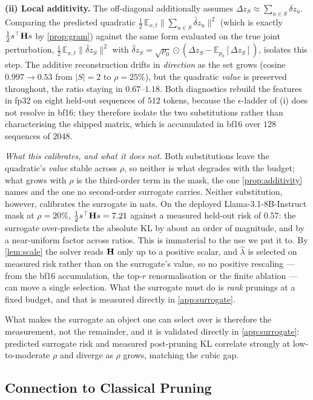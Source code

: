 \textbf{(ii) Local additivity.} The off-diagonal additionally assumes
$\Delta z_S\approx\sum_{u\in S}\delta z_u$. Comparing the predicted quadratic
$\tfrac12\,\mathbb{E}_{x,t}\|\sum_{u\in S}\widetilde{\delta z}_u\|^2$ (which is exactly
$\tfrac12 s^\top\mathbf{H} s$ by \cref{prop:gram}) against the same form evaluated on the true joint
perturbation, $\tfrac12\,\mathbb{E}_{x,t}\|\widetilde{\delta z}_S\|^2$ with
$\widetilde{\delta z}_S=\sqrt{p_0}\odot(\Delta z_S-\mathbb{E}_{p_0}[\Delta z_S])$, isolates this
step. The additive reconstruction drifts in
\emph{direction} as the set grows (cosine $0.997\!\to\!0.53$ from $|S|=2$ to $\rho=25\%$), but the
quadratic \emph{value} is preserved throughout, the ratio staying in $0.67$--$1.18$. Both diagnostics
rebuild the features in fp32 on eight held-out sequences of
$512$ tokens, because the $\epsilon$-ladder of (i) does not resolve in bf16; they therefore isolate the
two substitutions rather than characterising the shipped matrix, which is accumulated in bf16 over
$128$ sequences of $2048$.

\noindent\emph{What this calibrates, and what it does not.} Both substitutions leave the quadratic's
\emph{value} stable across $\rho$, so neither is what degrades with the budget; what grows with $\rho$ is
the third-order term in the mask, the one \cref{prop:additivity} names and the one no second-order
surrogate carries. Neither substitution, however, calibrates the surrogate in nats. On the deployed
Llama-3.1-8B-Instruct mask at $\rho{=}20\%$, $\tfrac12 s^\top\mathbf{H} s=7.21$ against a measured held-out
risk of $0.57$: the surrogate over-predicts the absolute KL by about an order of magnitude, and by a
near-uniform factor across ratios. This is immaterial to the use we put it to. By \cref{lem:scale} the
solver reads $\mathbf{H}$ only up to a positive scalar, and $\hat\lambda$ is selected on measured risk rather
than on the surrogate's value, so no positive rescaling --- from the bf16 accumulation, the top-$r$
renormalisation or the finite ablation --- can move a single selection. What the surrogate must do is
\emph{rank} prunings at a fixed budget, and that is measured directly in \cref{app:surrogate}.

\noindent What makes the surrogate an object one can select over is therefore the measurement, not the
remainder, and it is validated directly in \cref{app:surrogate}: predicted surrogate
risk and measured post-pruning KL correlate strongly at low-to-moderate $\rho$ and diverge as $\rho$
grows, matching the cubic gap.
\subsection{Connection to Classical Pruning}

